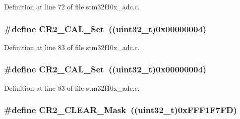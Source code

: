 Definition at line 72 of file stm32f10x\+\_\+adc.\+c.

\subsubsection[{\texorpdfstring{C\+R2\+\_\+\+C\+A\+L\+\_\+\+Set}{CR2_CAL_Set}}]{\setlength{\rightskip}{0pt plus 5cm}\#define C\+R2\+\_\+\+C\+A\+L\+\_\+\+Set~(({\bf uint32\+\_\+t})0x00000004)}\hypertarget{group___a_d_c___private___defines_ga6705aae168367a2d961e64dd9137ae3a}{}\label{group___a_d_c___private___defines_ga6705aae168367a2d961e64dd9137ae3a}


Definition at line 83 of file stm32f10x\+\_\+adc.\+c.

\subsubsection[{\texorpdfstring{C\+R2\+\_\+\+C\+A\+L\+\_\+\+Set}{CR2_CAL_Set}}]{\setlength{\rightskip}{0pt plus 5cm}\#define C\+R2\+\_\+\+C\+A\+L\+\_\+\+Set~(({\bf uint32\+\_\+t})0x00000004)}\hypertarget{group___a_d_c___private___defines_ga6705aae168367a2d961e64dd9137ae3a}{}\label{group___a_d_c___private___defines_ga6705aae168367a2d961e64dd9137ae3a}


Definition at line 83 of file stm32f10x\+\_\+adc.\+c.

\subsubsection[{\texorpdfstring{C\+R2\+\_\+\+C\+L\+E\+A\+R\+\_\+\+Mask}{CR2_CLEAR_Mask}}]{\setlength{\rightskip}{0pt plus 5cm}\#define C\+R2\+\_\+\+C\+L\+E\+A\+R\+\_\+\+Mask~(({\bf uint32\+\_\+t})0x\+F\+F\+F1\+F7\+F\+D)}\hypertarget{group___a_d_c___private___defines_ga49192361afb92aee0e3f1124ef1131a0}{}\label{group___a_d_c___private___defines_ga49192361afb92aee0e3f1124ef1131a0}


